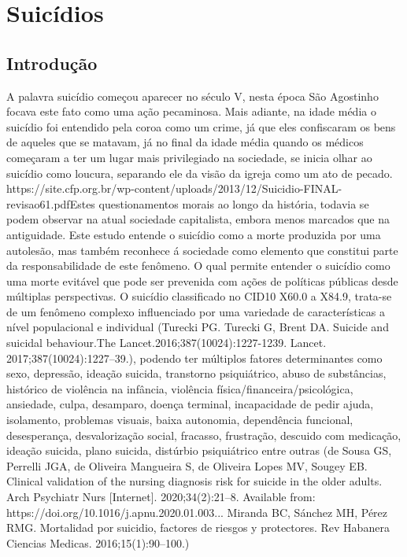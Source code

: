 
\chapter{Suicídios}

\section{Introdução}
A palavra suicídio começou aparecer no século V, nesta época São Agostinho focava este fato como uma ação pecaminosa. Mais adiante, na idade média o suicídio foi entendido pela coroa como um crime, já que eles confiscaram os bens de aqueles que se matavam, já no final da idade média quando os médicos começaram a ter um lugar mais privilegiado na sociedade, se inicia olhar ao suicídio como loucura, separando ele da visão da igreja como um ato de pecado. https://site.cfp.org.br/wp-content/uploads/2013/12/Suicidio-FINAL-revisao61.pdfEstes questionamentos morais ao longo da história, todavia se podem observar na atual sociedade capitalista, embora menos marcados que na antiguidade.
Este estudo entende o suicídio como a morte produzida por uma autolesão, mas também reconhece á sociedade como elemento que constitui parte da responsabilidade de este fenômeno. O qual permite entender o suicídio como uma morte evitável que pode ser prevenida com ações de políticas públicas desde múltiplas perspectivas. 
O suicídio classificado no CID10 X60.0 a X84.9, trata-se de um fenômeno complexo influenciado por uma variedade de características a nível populacional e individual (Turecki PG. Turecki G, Brent DA. Suicide and suicidal behaviour.The Lancet.2016;387(10024):1227-1239. Lancet. 2017;387(10024):1227–39.), podendo ter múltiplos fatores determinantes como sexo, depressão, ideação suicida, transtorno psiquiátrico, abuso de substâncias, histórico de violência na infância, violência física/financeira/psicológica, ansiedade, culpa, desamparo, doença terminal, incapacidade de pedir ajuda, isolamento, problemas visuais, baixa autonomia, dependência funcional, desesperança, desvalorização social, fracasso, frustração, descuido com medicação, ideação suicida, plano suicida, distúrbio psiquiátrico entre  outras (de Sousa GS, Perrelli JGA, de Oliveira Mangueira S, de Oliveira Lopes MV, Sougey EB. Clinical validation of the nursing diagnosis risk for suicide in the older adults. Arch Psychiatr Nurs [Internet]. 2020;34(2):21–8. Available from: https://doi.org/10.1016/j.apnu.2020.01.003... Miranda BC, Sánchez MH, Pérez RMG. Mortalidad por suicidio, factores de riesgos y protectores. Rev Habanera Ciencias Medicas. 2016;15(1):90–100.)
